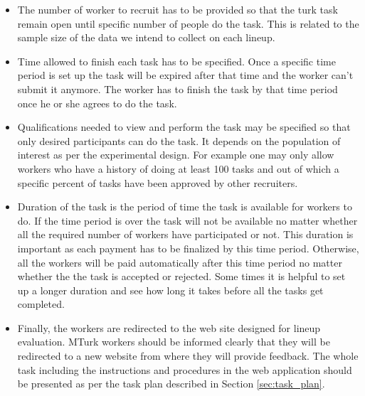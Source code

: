 \documentclass[11pt]{article}
\begin{document}
\begin{itemize}

\item The number of worker to recruit has to be provided so that the turk task remain open until specific number of people do the task. This is related to the sample size of the data we intend to collect on each lineup. 

\item Time allowed to finish each task has to be specified. Once a specific time period is set up the task will be expired after that time and the worker can't submit it anymore. The worker has to finish the task by that time period once he or she agrees to do the task. 

\item Qualifications needed to view and perform the task may be specified so that only desired participants can do the task. It depends on the population of interest as per the experimental design. For example one may only allow workers who have a history of doing at least 100 tasks and out of which a specific percent of tasks have been approved by other recruiters. 

\item Duration of the task is the period of time the task is available for workers to do. If the time period is over the task will not be available no matter whether all the required number of workers have participated or not. This duration is important as each payment has to be finalized by this time period. Otherwise, all the workers will be paid automatically after this time period no matter whether the the task is accepted or rejected. Some times it is helpful to set up a longer duration and see how long it takes before all the tasks get completed.

\item Finally, the workers are redirected to the web site designed for lineup evaluation. MTurk workers should be informed clearly that they will be redirected to a new website from where they will provide feedback. The whole task including the instructions and procedures in the web application should be presented as per the task plan described in Section \ref{sec:task_plan}.

\end{itemize}
\end{document}
